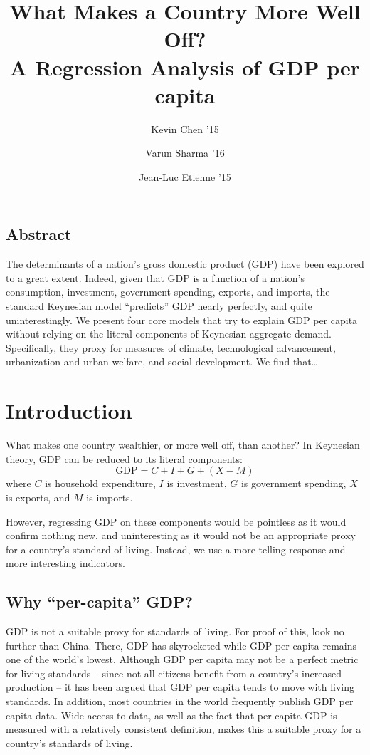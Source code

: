 \documentclass[12pt, twocolumn]{article}
\title{
  \sc
  What Makes a Country More Well Off? \\
  A Regression Analysis of GDP per capita
}
\author{
    {\rm Kevin Chen '15} \\ 
    \and
    {\rm Varun Sharma '16} \\ 
    \and
    {\rm Jean-Luc Etienne '15} \\ 
}
\begin{document}
\date{}
\maketitle
\doublespacing


\subsection*{\sc Abstract}
The determinants of a nation's gross domestic product (GDP) have been explored to a great extent. Indeed, given that GDP is a function of a nation's consumption, investment, government spending, exports, and imports, the standard Keynesian model ``predicts'' GDP nearly perfectly, and quite uninterestingly. We present four core models that try to explain GDP per capita without relying on the literal components of Keynesian aggregate demand. Specifically, they proxy for measures of climate, technological advancement, urbanization and urban welfare, and social development.
We find that\dots %



\section{Introduction}
What makes one country wealthier, or more well off, than another? In Keynesian theory, GDP can be reduced to its literal components:
$$\mathrm{GDP} = C + I + G + (X - M)$$
where $C$ is household expenditure, $I$ is investment,  $G$ is government spending, $X$ is exports, and $M$ is imports.

However, regressing GDP on these components would be pointless as it would confirm nothing new, and uninteresting as it would not be an appropriate proxy for a country's standard of living. Instead, we use a more telling response and more interesting indicators.

\subsection{Why ``per-capita'' GDP?}
GDP is not a suitable proxy for standards of living. For proof of this, look no further than China. There, GDP has skyrocketed while GDP per capita remains one of the world's lowest. Although GDP per capita may not be a perfect metric for living standards -- since not all citizens benefit from a country's increased production -- it has been argued that GDP per capita tends to move with living standards. In addition, most countries in the world frequently publish GDP per capita data. Wide access to data, as well as the fact that per-capita GDP is measured with a relatively consistent definition, makes this a suitable proxy for a country's standards of living.
\end{document}
